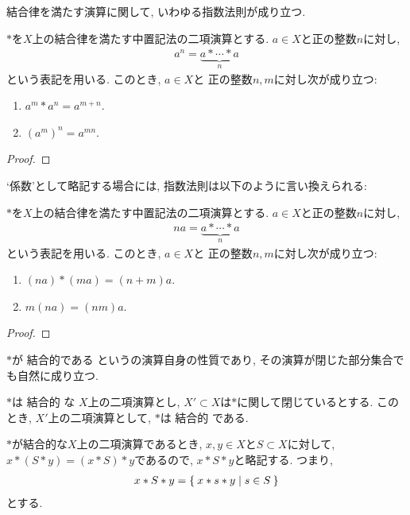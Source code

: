 結合律を満たす演算に関して, いわゆる指数法則が成り立つ.
\begin{prop}
  $\ast$を$X$上の結合律を満たす中置記法の二項演算とする.
  $a\in X$と正の整数$n$に対し,
  \begin{align*}
    a^n=\underbrace{a\ast \cdots \ast a}_{n}
  \end{align*}
  という表記を用いる.
  このとき,
  $a\in X$と
  正の整数$n,m$に対し次が成り立つ:
  \begin{enumerate}
    \item $a^m\ast a^n=a^{m+n}$.
    \item $(a^m)^n=a^{mn}$.
  \end{enumerate}
\end{prop}
\begin{proof}\end{proof}
`係数'として略記する場合には, 指数法則は以下のように言い換えられる:
\begin{prop}
  $\ast$を$X$上の結合律を満たす中置記法の二項演算とする.
  $a\in X$と正の整数$n$に対し,
  \begin{align*}
    na=\underbrace{a\ast \cdots \ast a}_{n}
  \end{align*}
  という表記を用いる.
  このとき,
  $a\in X$と
  正の整数$n,m$に対し次が成り立つ:
  \begin{enumerate}
    \item $(na)\ast (ma)=(n+m)a$.
    \item $m(na)=(nm)a$.
  \end{enumerate}
\end{prop}
\begin{proof}\end{proof}

$\ast$が
結合的である
というの演算自身の性質であり,
その演算が閉じた部分集合でも自然に成り立つ.
\begin{prop}
  $\ast$は
  結合的
  な
  $X$上の二項演算とし,
  $X'\subset X$は$\ast$に関して閉じているとする.
  このとき,
  $X'$上の二項演算として,
  $\ast$は
  結合的
  である.
\end{prop}

\begin{remark}
$\ast$が結合的な$X$上の二項演算であるとき,
  $x,y\in X$と$S\subset X$に対して,
  $x\ast(S\ast y)=(x\ast S)\ast y$であるので,
  $x\ast S \ast y$と略記する.
  つまり,
  \begin{align*}
    x\ast S \ast y=\Set{x\ast s \ast y|s\in S}
  \end{align*}
  とする.
\end{remark}

